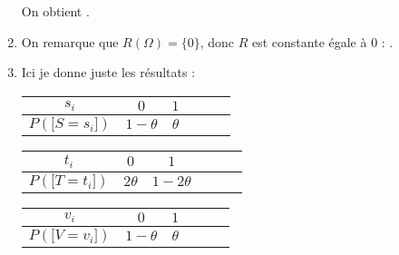 \documentclass[a4paper, 11pt,reqno]{article}
\begin{document}
\begin{correction}
\begin{enumerate}
		      On obtient .
		\item On remarque que $R(\Omega) = \{0\}$, donc  $R$ est constante \'egale \`a $0$ : .
		\item Ici je donne juste les r\'esultats :
		      \begin{center} \begin{tabular}{|c|c|c|c|c|c|} \hline $s_i$     & $0$        & $1$       \\
               \hline $P(\lbrack S=s_i\rbrack)$ & $1-\theta$ & $ \theta$
               \\ \hline
			      \end{tabular} %
			      \quad \begin{tabular}{|c|c|c|c|c|c|} \hline $t_i$     & $0$        & $1$         \\
               \hline $P(\lbrack T=t_i\rbrack)$ & $2 \theta$ & $1-2\theta$
               \\ \hline
			      \end{tabular} %
			      \quad \begin{tabular}{|c|c|c|c|c|c|} \hline $v_i$     & $0$        & $1$      \\
               \hline $P(\lbrack V=v_i\rbrack)$ & $1-\theta$ & $\theta$
               \\ \hline
			      \end{tabular} \end{center}
	\end{enumerate}
\end{correction}
\end{document}
